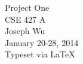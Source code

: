 \documentclass[a4paper, 12pt]{report}
\begin{document}
    \begin{center}
        {\LARGE Project One} \\
        CSE 427 A \\
        Joseph Wu  \\
        January 20-28, 2014 \\
        {\tiny Typeset via \LaTeX}
    \end{center}
    
\end{document}

